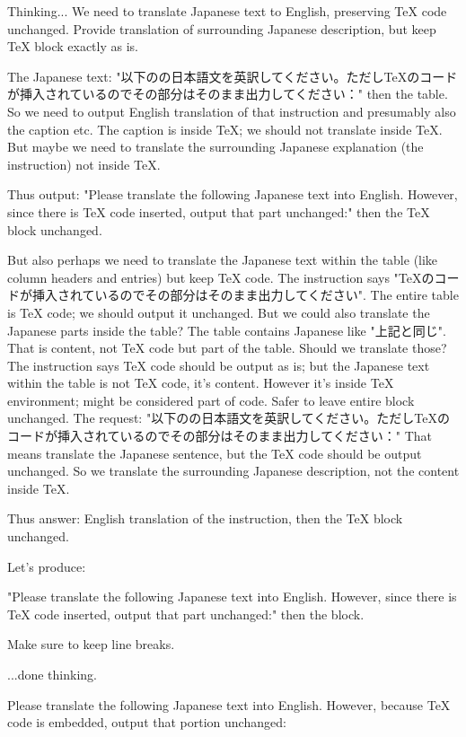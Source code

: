 Thinking...
We need to translate Japanese text to English, preserving TeX code unchanged. Provide translation of surrounding Japanese description, but keep TeX block exactly as is.

The Japanese text: "以下のの日本語文を英訳してください。ただしTeXのコードが挿入されているのでその部分はそのまま出力してください：" then the table. So we need to output English translation of that instruction and presumably also the caption etc. The caption is inside TeX; we should not translate inside TeX. But maybe we need to translate the surrounding Japanese explanation (the instruction) not inside TeX.

Thus output: "Please translate the following Japanese text into English. However, since there is TeX code inserted, output that part unchanged:" then the TeX block unchanged.

But also perhaps we need to translate the Japanese text within the table (like column headers and entries) but keep TeX code. The instruction says "TeXのコードが挿入されているのでその部分はそのまま出力してください". The entire table is TeX code; we should output it unchanged. But we could also translate the Japanese parts inside the table? The table contains Japanese like "上記と同じ". That is content, not TeX code but part of the table. Should we translate those? The instruction says TeX code should be output as is; but the Japanese text within the table is not TeX code, it's content. However it's inside TeX environment; might be considered part of code. Safer to leave entire block unchanged. The request: "以下のの日本語文を英訳してください。ただしTeXのコードが挿入されているのでその部分はそのまま出力してください：" That means translate the Japanese sentence, but the TeX code should be output unchanged. So we translate the surrounding Japanese description, not the content inside TeX.

Thus answer: English translation of the instruction, then the TeX block unchanged.

Let's produce:

"Please translate the following Japanese text into English. However, since there is TeX code inserted, output that part unchanged:" then the block.

Make sure to keep line breaks.

...done thinking.

Please translate the following Japanese text into English. However, because TeX code is embedded, output that portion unchanged:

